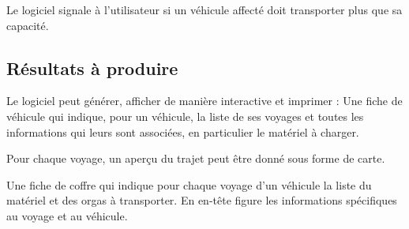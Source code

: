 Le logiciel signale à l'utilisateur si un véhicule affecté doit transporter plus que sa capacité.

\subsection{Résultats à produire}
Le logiciel peut générer, afficher de manière interactive et imprimer :
Une fiche de véhicule qui indique, pour un véhicule, la liste de ses voyages et toutes les informations qui leurs sont associées, en particulier le matériel à charger.

Pour chaque voyage, un aperçu du trajet peut être donné sous forme de carte.

Une fiche de coffre qui indique pour chaque voyage d'un véhicule la liste du matériel et des orgas à transporter.
En en-tête figure les informations spécifiques au voyage et au véhicule.


